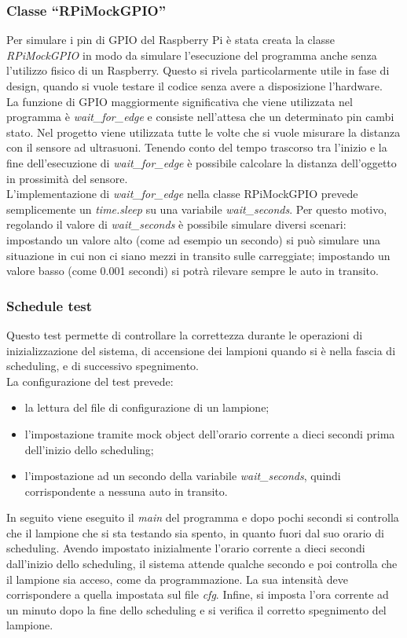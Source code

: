 \subsubsection{Classe ``RPiMockGPIO''}
Per simulare i pin di GPIO del Raspberry Pi è stata creata la classe \textit{RPiMockGPIO} in modo da simulare l'esecuzione del programma anche senza l'utilizzo fisico di un Raspberry.
Questo si rivela particolarmente utile in fase di design, quando si vuole testare il codice senza avere a disposizione l'hardware.
\\La funzione di GPIO maggiormente significativa che viene utilizzata nel programma è \textit{wait\_for\_edge} e consiste nell'attesa che un determinato pin cambi stato.
Nel progetto viene utilizzata tutte le volte che si vuole misurare la distanza con il sensore ad ultrasuoni.
Tenendo conto del tempo trascorso tra l'inizio e la fine dell'esecuzione di \textit{wait\_for\_edge} è possibile calcolare la distanza dell'oggetto in prossimità del sensore.
\\L'implementazione di \textit{wait\_for\_edge} nella classe RPiMockGPIO prevede semplicemente un \textit{time.sleep} su una variabile \textit{wait\_seconds}.
Per questo motivo, regolando il valore di \textit{wait\_seconds} è possibile simulare diversi scenari: impostando un valore alto (come ad esempio un secondo) si può simulare una situazione in cui non ci siano mezzi in transito sulle carreggiate;
impostando un valore basso (come 0.001 secondi) si potrà rilevare sempre le auto in transito.

\subsubsection{Schedule test \label{st}}
Questo test permette di controllare la correttezza durante le operazioni di inizializzazione del sistema, di accensione dei lampioni quando si è nella fascia di scheduling, e di successivo spegnimento.
\\La configurazione del test prevede:
\begin{itemize}
	\item la lettura del file di configurazione di un lampione;
	\item l'impostazione tramite mock object dell'orario corrente a dieci secondi prima dell'inizio dello scheduling;
	\item l'impostazione ad un secondo della variabile \textit{wait\_seconds}, quindi corrispondente a nessuna auto in transito.
\end{itemize}
In seguito viene eseguito il \textit{main} del programma e dopo pochi secondi si controlla che il lampione che si sta testando sia spento, in quanto fuori dal suo orario di scheduling.
Avendo impostato inizialmente l'orario corrente a dieci secondi dall'inizio dello scheduling, il sistema attende qualche secondo e poi controlla che il lampione sia acceso, come da programmazione.
La sua intensità deve corrispondere a quella impostata sul file \textit{cfg}.
Infine, si imposta l'ora corrente ad un minuto dopo la fine dello scheduling e si verifica il corretto spegnimento del lampione.

